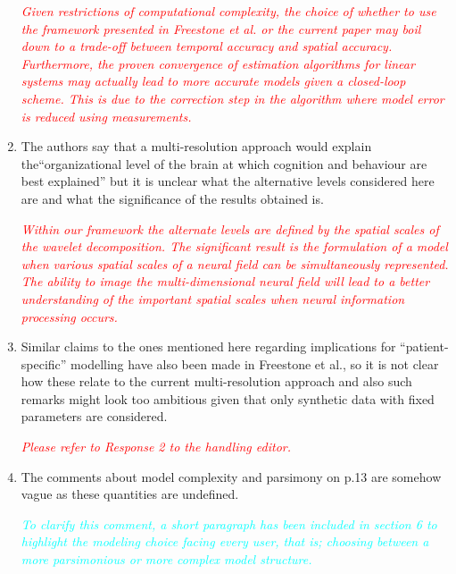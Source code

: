 \documentclass{article}
\newcommand{\dean}[1]{\textcolor{red}{#1}}
\newcommand{\parham}[1]{\textcolor{blue}{#1}}
\newcommand{\ken}[1]{\textcolor{cyan}{#1}}
\begin{document}
\begin{enumerate}
\emph{\dean{Given restrictions of computational complexity, the choice of whether to use the framework presented in Freestone et al. or the current paper may boil down to a trade-off between temporal accuracy and spatial accuracy. Furthermore, the proven convergence of estimation algorithms for linear systems may actually lead to more accurate models given a closed-loop scheme. This is due to the correction step in the algorithm where model error is reduced using measurements. }}
				

        \item The authors say that a multi-resolution approach would explain the``organizational level of the brain at which cognition and behaviour are best explained'' but it is unclear what the alternative levels considered here are and what the significance of the results obtained is.

\dean{\emph{Within our framework the alternate levels are defined by the spatial scales of the wavelet decomposition. The significant result is the formulation of a model when various spatial scales of a neural field can be simultaneously represented. The ability to image the multi-dimensional neural field will lead to a better understanding of the important spatial scales when neural information processing occurs.  }}

				\item Similar claims to the ones mentioned here regarding  implications for ``patient-specific'' modelling have also been made in Freestone et al., so it is not clear how these relate to the current multi-resolution approach and also such remarks might look too ambitious given that only synthetic data with fixed parameters are considered.
				
				\dean{\emph{Please refer to Response 2 to the handling editor.}}
				
				\item The comments about model complexity and parsimony on p.13 are somehow vague as these quantities are undefined.
				
				
				\emph{\ken{To clarify this comment, a short paragraph has been included in section 6 to highlight the modeling choice facing every user, that is; choosing between a more parsimonious or more complex model structure.}}
				

\end{enumerate}
\end{document}
